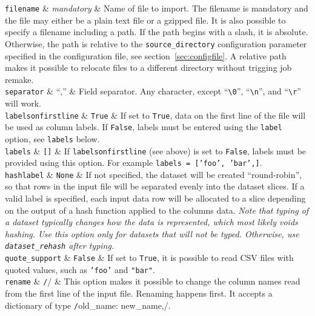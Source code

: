 \starttable
  \RP \texttt{filename} & \emph{mandatory} & Name of file to import.  The
  filename is mandatory and the file may either be a plain text file
  or a gzipped file.  It is also possible to specify a filename
  including a path.  If the path begins with a slash, it is absolute.
  Otherwise, the path is relative to the \texttt{source\_directory}
  configuration parameter specified in the configuration
  file, see section~\ref{sec:configfile}.  A relative path makes it
  possible to relocate files to a different directory without trigging
  job remake.\\
  
  \RP \texttt{separator} & ``,'' & Field separator.  Any character, except
  ``\verb$\0$'', ``\verb$\n$'', and ``\verb$\r$'' will work.\\

  
  \RP \texttt{labelsonfirstline} & \texttt{True} & If set to
  \texttt{True}, data on the first line of the file will be used as
  column labels.  If \texttt{False}, labels must be entered using the
  \texttt{label} option, see \texttt{labels} below.\\

  \RP \texttt{labels} & \texttt{[]} & If \texttt{labelsonfirstline} (see
  above) is set to \texttt{False}, labels must be provided using this
  option.  For example \texttt{labels = ['foo', 'bar',]}.\\

  \RP \texttt{hashlabel} & \texttt{None} & If not specified, the dataset
  will be created ``round-robin'', so that rows in the input file will
  be separated evenly into the dataset slices.  If a valid label is
  specified, each input data row will be allocated to a slice
  depending on the output of a hash function applied to the columns
  data.  \textsl{Note that typing of a dataset typically changes how
    the data is represented, which most likely voids hashing.  Use
    this option only for datasets that will not be typed.  Otherwise,
    use \texttt{dataset\_rehash} after typing.}\\

  \RP \texttt{quote\_support} & \texttt{False} & If set to \texttt{True},
  it is possible to read CSV files with quoted values, such as
  \texttt{'foo'} and \texttt{"bar"}.\\

  \RP \texttt{rename} & \texttt/{}/ & This option makes it possible to
  change the column names read from the first line of the input file.
  Renaming happens first.  It accepts a dictionary of type
  \texttt/{old_name: new_name,}/.\\

